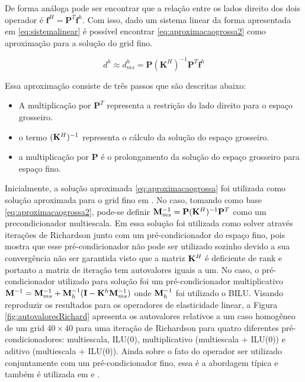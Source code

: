 De forma análoga pode ser encontrar que a relação entre os lados direito dos dois operador é $\mathbf{f}^H = \mathbf{P}^T \mathbf{f}^h$. Com isso, dado um sistema linear da forma apresentada em \eqref{eq:sistemalinear} é possível encontrar  \eqref{eq:aproximacaogrossa2} como aproximação para a solução do grid fino.

\begin{equation} \label{eq:aproximacaogrossa2}
    d^h \approx d^h_{ms} = \mathbf{P} (\mathbf{K}^H)^{-1} \mathbf{P}^{T} \mathbf{f}^h
\end{equation}

Essa aproximação consiste de três passos que são descritas abaixo:

\begin{itemize}
    \item A multiplicação por $\mathbf{P}^T$ representa a restrição do lado direito para o espaço grosseiro.
    \item  o termo $(\mathbf{K}^H)^{-1}$ representa o cálculo da solução do espaço grosseiro.
    \item a multiplicação por $\mathbf{P}$ é o prolongamento da solução do espaço grosseiro para espaço fino.
\end{itemize}


Inicialmente, a solução aproximada \eqref{eq:aproximacaogrossa} foi utilizada como solução aproximada para o grid fino em \cite{thomashou}. No caso, tomando como base \eqref{eq:aproximacaogrossa2}, pode-se definir $\mathbf{M}^{-1}_{ms} = \mathbf{P} (\mathbf{K}^H)^{-1} \mathbf{P}^{T}$ como um precondicionador multiescala. Em \citet{zhouiterativo}  essa solução foi utilizada como solver através iterações de Richardson junto com um pré-condicionador do espaço fino, pois mostra que esse pré-condicionador não pode ser utilizado sozinho devido a sua convergência não ser garantida visto que a matriz $\mathbf{K}^H$ é deficiente de rank e portanto a matriz de  iteração tem autovalores iguais a um. No caso, o pré-condicionador utilizado para solução foi um pré-condicionador  multiplicativo $\mathbf{M}^{-1}=\mathbf{M}^{-1}_{ms} +\mathbf{M}^{-1}_{h}(\mathbf{I} - \mathbf{K}^h \mathbf{M}^{-1}_{ms})$ onde $\mathbf{M}^{-1}_{h}$ foi utilizado o BILU. Visando reproduzir os resultados para os operadores de elasticidade linear, a Figura \ref{fig:autovaloresRichard} apresenta os autovalores relativos a um caso homogêneo de um grid $40\times40$ para uma iteração de Richardson para quatro diferentes pré-condicionadores: multiescala, ILU(0), multiplicativo (multiescala + ILU(0)) e aditivo (multiescala + ILU(0)). Ainda sobre o fato do operador ser utilizado conjuntamente com um pré-condicionador fino, essa é a abordagem típica e também é utilizada em \cite{casteletto} e \cite{msparalelo}.


